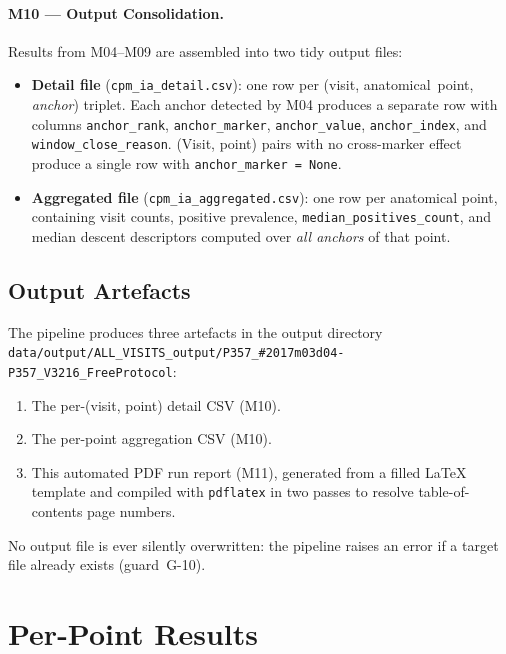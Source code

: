 \documentclass[a4paper,11pt]{article}
\begin{document}
\paragraph{M10 --- Output Consolidation.}
Results from M04--M09 are assembled into two tidy output files:
\begin{itemize}
  \item \textbf{Detail file} (\texttt{cpm\_ia\_detail.csv}): one row per
        (visit, anatomical~point, \emph{anchor}) triplet. Each anchor detected by M04
        produces a separate row with columns \texttt{anchor\_rank},
        \texttt{anchor\_marker}, \texttt{anchor\_value}, \texttt{anchor\_index},
        and \texttt{window\_close\_reason}.
        (Visit, point) pairs with no cross-marker effect produce a single row with
        \texttt{anchor\_marker = None}.
  \item \textbf{Aggregated file} (\texttt{cpm\_ia\_aggregated.csv}): one row per
        anatomical point, containing visit counts, positive prevalence,
        \texttt{median\_positives\_count}, and median descent descriptors computed over
        \emph{all anchors} of that point.
\end{itemize}

\subsection{Output Artefacts}

The pipeline produces three artefacts in the output directory \texttt{data/output/ALL\_VISITS\_output/P357\_\#2017m03d04-P357\_V3216\_FreeProtocol}:
\begin{enumerate}
  \item The per-(visit, point) detail CSV (M10).
  \item The per-point aggregation CSV (M10).
  \item This automated PDF run report (M11), generated from a filled \LaTeX{} template
        and compiled with \texttt{pdflatex} in two passes to resolve table-of-contents
        page numbers.
\end{enumerate}
No output file is ever silently overwritten: the pipeline raises an error if a target
file already exists (guard~G-10).

\section{Per-Point Results}
\end{document}
